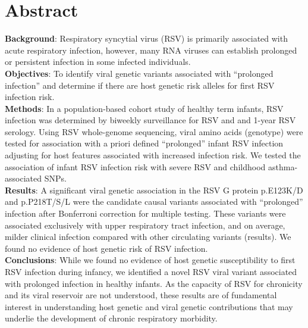 \documentclass{article} %
\begin{document}
\section{Abstract}
\textbf{Background}: Respiratory syncytial virus (RSV) is primarily associated with acute respiratory infection, however, many RNA viruses can establish prolonged or persistent infection in some infected individuals.\\
\textbf{Objectives}: To identify viral genetic variants associated with “prolonged infection” and determine if there are host genetic risk alleles for first RSV infection risk.\\
\textbf{Methods}: In a population-based cohort study of healthy term infants, RSV infection was determined by biweekly surveillance for RSV and and 1-year RSV serology. Using RSV whole-genome sequencing, viral amino acids (genotype) were tested for association with a priori defined ``prolonged'' infant RSV infection adjusting for host features associated with increased infection risk. We tested the association of infant RSV infection risk with severe RSV and childhood asthma-associated SNPs.\\
\textbf{Results}: A significant viral genetic association in the RSV G protein p.E123K/D and p.P218T/S/L were the candidate causal variants associated with ``prolonged'' infection after Bonferroni correction for multiple testing. These variants were associated exclusively with upper respiratory tract infection, and on average, milder clinical infection compared with other circulating variants (results). We found no evidence of host genetic risk of RSV infection.\\
\textbf{Conclusions}: While we found no evidence of host genetic susceptibility to first RSV infection during infancy, we identified a novel RSV viral variant associated with prolonged infection in healthy infants. As the capacity of RSV for chronicity and its viral reservoir are not understood, these results are of fundamental interest in understanding host genetic and viral genetic contributions that may underlie the development of chronic respiratory morbidity.
\end{document}
